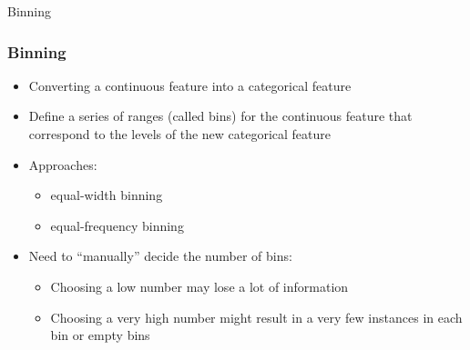 \begin{frame}
  \begin{center}
    {\Large Binning}
  \end{center}
\end{frame}


\begin{frame}[fragile]\frametitle{Binning}	
\begin{itemize}
\item Converting a continuous feature into a categorical feature
\item Define a series of ranges (called bins) for the continuous feature that correspond to the levels of the new categorical feature
\item Approaches: 
	\begin{itemize}
	\item equal-width binning 
	\item equal-frequency binning 
	\end{itemize}
\item Need to ``manually'' decide the number of bins:
	\begin{itemize}
	\item Choosing a low number may lose a lot of information
	\item Choosing a very high number might result in a very few instances in each bin or empty bins
	\end{itemize}
\end{itemize}
\end{frame}


